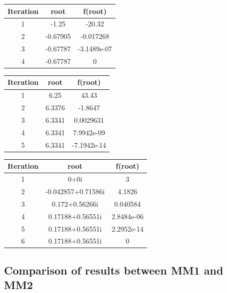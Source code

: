 \documentclass[12pt]{report}
\begin{document}
\begin{center}
  \begin{tabular}{| c  c c |}
\hline
Iteration & root         & f(root) \\
\hline
1    &     -1.25   &       -20.32 \\
\hline
2    &  -0.67905   &    -0.017268 \\
\hline
3    &  -0.67787   &  -3.1489e-07 \\
\hline
4    & -0.67787    &           0 \\
\hline
\hline
\hline

\end{tabular}
\end{center}

\begin{center}
  \begin{tabular}{| c  c c |}
\hline
Iteration & root         & f(root) \\
\hline
1   &     6.25   &        43.43 \\
\hline
2   &   6.3376   &      -1.8647 \\
\hline
3   &  6.3341    &   0.0029631 \\
\hline
4   &   6.3341   &  7.9942e-09\\
\hline
5   &  6.3341    & -7.1942e-14\\
\hline


\end{tabular}
\end{center}


\begin{center}
  \begin{tabular}{| c  c c |}
\hline
Iteration & root         & f(root) \\
\hline
1   &           0+0i           &           3 \\
\hline
2   &   -0.042857+0.71586i     &      4.1826 \\
\hline
3   &       0.172+0.56266i     &    0.040584 \\
\hline
4   &    0.17188+0.56551i     &  2.8484e-06 \\
\hline
5   &     0.17188+0.56551i    &   2.2952e-14 \\
\hline
6   &     0.17188+0.56551i    &            0 \\
\hline


\end{tabular}
\end{center}


\subsection{Comparison of results between MM1 and MM2}
\end{document}
